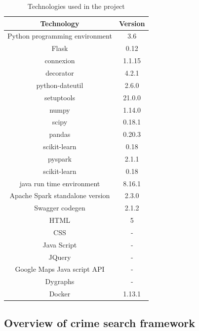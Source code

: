 \begin{table}[htb]
\centering
\caption{Technologies used in the project}\label{tab:technology}
\begin{tabular}{*{2}{c}}
\toprule
Technology                      & Version \\
\midrule
Python programming environment  & 3.6     \\
Flask                           & 0.12    \\
connexion                       & 1.1.15  \\
decorator                       & 4.2.1   \\
python-dateutil                 & 2.6.0   \\
setuptools                      & 21.0.0  \\
numpy                           & 1.14.0  \\
scipy                           & 0.18.1  \\
pandas                          & 0.20.3  \\
scikit-learn                    & 0.18    \\
pyspark                         & 2.1.1   \\
scikit-learn                    & 0.18    \\
java run time environment       & 8.16.1  \\
Apache Spark standalone version & 2.3.0   \\
Swagger codegen                 & 2.1.2   \\
HTML                            & 5       \\
CSS                             & -       \\
Java Script                     & -       \\
JQuery                          & -       \\
Google Maps Java script API     & -       \\
Dygraphs                        & -       \\
Docker                          & 1.13.1  \\
\bottomrule
\end{tabular}
\end{table}

\subsection{Overview of crime search framework}

